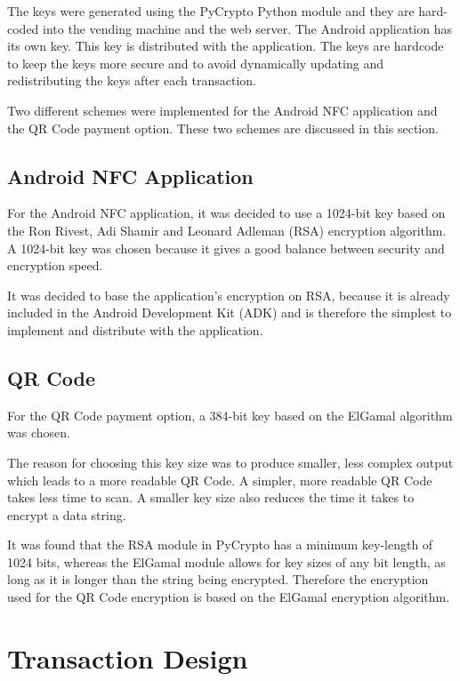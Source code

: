 The keys were generated using the PyCrypto Python module and they are hard-coded
into the vending machine and the web server. The Android application has
its own key. This key is distributed with the application. The keys are hardcode
to keep the keys more secure and to avoid dynamically updating and
redistributing the keys after each transaction.

Two different schemes were implemented for the Android NFC application and the
QR Code payment option. These two schemes are discussed in this section.

\subsection{Android NFC Application}

For the Android NFC application, it was decided to use a 1024-bit key based on
the Ron Rivest, Adi Shamir and Leonard Adleman (RSA) encryption algorithm. A
1024-bit key was chosen because it gives a good balance between security
and encryption speed.

It was decided to base the application's encryption on RSA, because it is
already included in the Android Development Kit (ADK) and is therefore the
simplest to implement and distribute with the application. 

\subsection{QR Code}

For the QR Code payment option, a 384-bit key based on the ElGamal algorithm was
chosen. 

The reason for choosing this key size was to produce smaller, less complex
output which leads to a more readable QR Code. A simpler, more readable QR Code
takes less time to scan. A smaller key size also reduces the time it takes to
encrypt a data string.

It was found that the RSA module in PyCrypto has a minimum key-length of 1024
bits, whereas the ElGamal module allows for key sizes of any bit length, as
long as it is longer than the string being encrypted. Therefore the encryption
used for the QR Code encryption is based on the ElGamal encryption algorithm.
 
\section{Transaction Design}
\label{sec:transaction}

